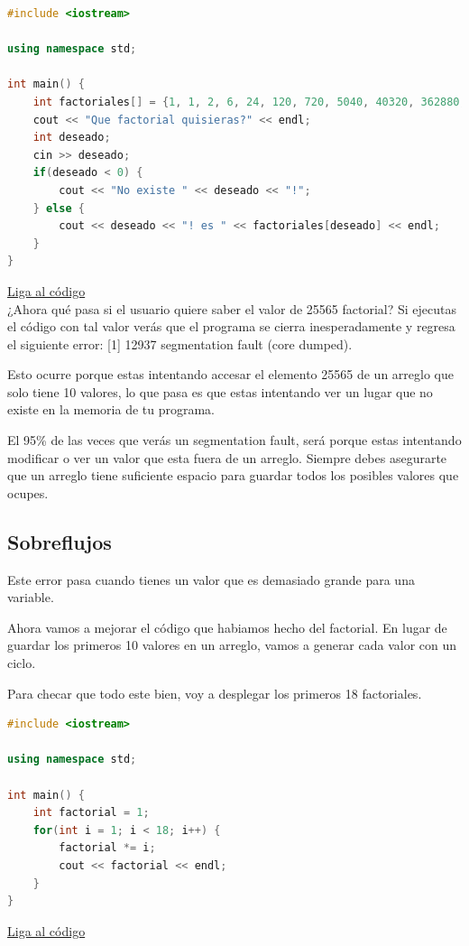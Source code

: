 \documentclass{article}
\begin{document}
\begin{lstlisting}[language=C++, title=Error de segmentación]
#include <iostream>

using namespace std;

int main() {
	int factoriales[] = {1, 1, 2, 6, 24, 120, 720, 5040, 40320, 362880, 3628800};
	cout << "Que factorial quisieras?" << endl;
	int deseado;
	cin >> deseado;
	if(deseado < 0) {
		cout << "No existe " << deseado << "!";
	} else {
		cout << deseado << "! es " << factoriales[deseado] << endl;
	}
}
\end{lstlisting}
\href{https://repl.it/@Jamesscn/Indices-Inexistentes}{Liga al código}\\

¿Ahora qué pasa si el usuario quiere saber el valor de 25565 factorial? Si ejecutas el código con tal valor verás que el programa se cierra inesperadamente y regresa el siguiente error: [1] 12937 segmentation fault (core dumped).

Esto ocurre porque estas intentando accesar el elemento 25565 de un arreglo que solo tiene 10 valores, lo que pasa es que estas intentando ver un lugar que no existe en la memoria de tu programa.

El 95\% de las veces que verás un segmentation fault, será porque estas intentando modificar o ver un valor que esta fuera de un arreglo. Siempre debes asegurarte que un arreglo tiene suficiente espacio para guardar todos los posibles valores que ocupes.

\subsection{Sobreflujos}
Este error pasa cuando tienes un valor que es demasiado grande para una variable.

Ahora vamos a mejorar el código que habiamos hecho del factorial. En lugar de guardar los primeros 10 valores en un arreglo, vamos a generar cada valor con un ciclo.

Para checar que todo este bien, voy a desplegar los primeros 18 factoriales.

\begin{lstlisting}[language=C++, title=Sobreflujo]
#include <iostream>

using namespace std;

int main() {
	int factorial = 1;
	for(int i = 1; i < 18; i++) {
		factorial *= i;
		cout << factorial << endl;
	}
}
\end{lstlisting}
\href{https://repl.it/@Jamesscn/Sobrefactorial}{Liga al código}\\
\end{document}
